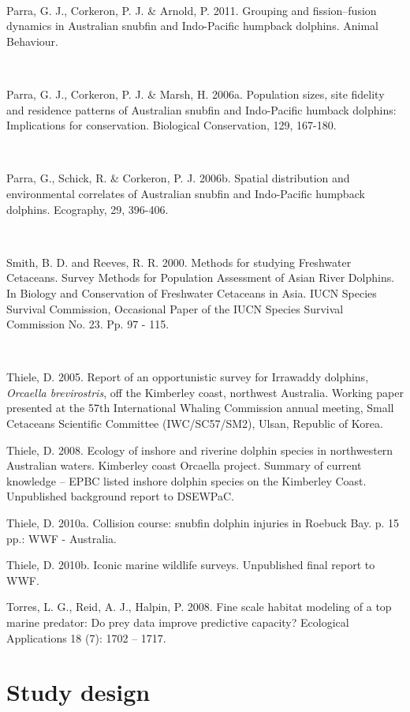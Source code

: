 \documentclass[version=last,
    paper=a4,                               %
    10pt,                                   %
    dvipsnames,
    oneside,                              %
    headings=openany,                       %
    open=any,
    BCOR=7mm,                               %
    DIV=15,     %
]{scrbook}
\begin{document}
~

Parra, G. J., Corkeron, P. J. \& Arnold, P. 2011. Grouping and
fission--fusion dynamics in Australian snubfin and Indo-Pacific humpback
dolphins. Animal Behaviour.

~

Parra, G. J., Corkeron, P. J. \& Marsh, H. 2006a. Population sizes, site
fidelity and residence patterns of Australian snubfin and Indo-Pacific
humback dolphins: Implications for conservation. Biological
Conservation, 129, 167-180.

~

Parra, G., Schick, R. \& Corkeron, P. J. 2006b. Spatial distribution and
environmental correlates of Australian snubfin and Indo-Pacific humpback
dolphins. Ecography, 29, 396-406.

~

Smith, B. D. and Reeves, R. R. 2000. Methods for studying Freshwater
Cetaceans. Survey Methods for Population Assessment of Asian River
Dolphins. In Biology and Conservation of Freshwater Cetaceans in Asia.
IUCN Species Survival Commission, Occasional Paper of the IUCN Species
Survival Commission No. 23. Pp. 97 - 115.

~

Thiele, D. 2005. Report of an opportunistic survey for Irrawaddy
dolphins, \emph{Orcaella brevirostris}, off the Kimberley coast,
northwest Australia. Working paper presented at the 57th International
Whaling Commission annual meeting, Small Cetaceans Scientific Committee
(IWC/SC57/SM2), Ulsan, Republic of Korea.

Thiele, D. 2008. Ecology of inshore and riverine dolphin species in
northwestern Australian waters. Kimberley coast Orcaella project.
Summary of current knowledge -- EPBC listed inshore dolphin species on
the Kimberley Coast. Unpublished background report to DSEWPaC.

Thiele, D. 2010a. Collision course: snubfin dolphin injuries in Roebuck
Bay. p. 15 pp.: WWF - Australia.

Thiele, D. 2010b. Iconic marine wildlife surveys. Unpublished final
report to WWF.

Torres, L. G., Reid, A. J., Halpin, P. 2008. Fine scale habitat modeling
of a top marine predator: Do prey data improve predictive capacity?
Ecological Applications 18 (7): 1702 -- 1717.



\section*{Study design}
\end{document}
